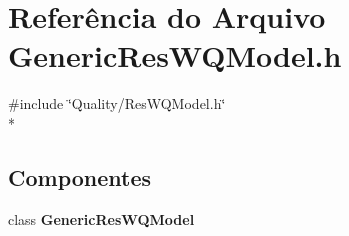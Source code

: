 \section{Referência do Arquivo Generic\+Res\+W\+Q\+Model.\+h}
\label{_generic_res_w_q_model_8h}
{\ttfamily \#include \char`\"{}Quality/\+Res\+W\+Q\+Model.\+h\char`\"{}}\\*
\subsection*{Componentes}
\begin{DoxyCompactItemize}
\item 
class {\bf Generic\+Res\+W\+Q\+Model}
\end{DoxyCompactItemize}
